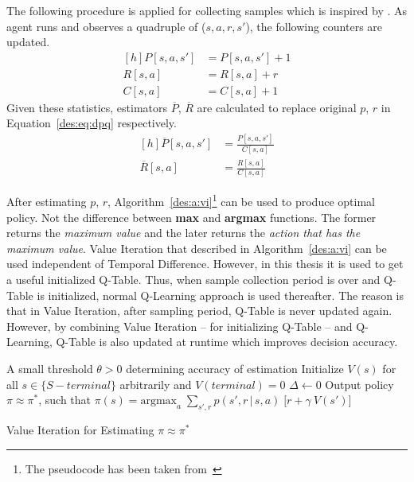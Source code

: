 The following procedure is applied for collecting samples which is inspired by \textcite{dutreilh:hal-01122123}. As agent runs and observes a quadruple of ($s,a,r,s'$), the following counters are updated.
\begin{equation}
\begin{aligned}[h]
P[s,a,s'] &= P[s,a,s'] + 1\\
R[s,a] &= R[s,a] + r \\
C[s,a] &= C[s,a] + 1
\end{aligned}
\end{equation}
Given these statistics, estimators $\overline{P}$, $\overline{R}$ are calculated to replace original $p$, $r$ in Equation~\ref{des:eq:dpq} respectively.
\begin{equation}
\begin{aligned}[h]
\overline{P}[s,a,s'] &= \frac{P[s,a,s']}{C[s,a]} \\
\overline{R}[s,a] &= \frac{R[s,a]}{C[s,a]}
\end{aligned}
\end{equation}

After estimating $p$, $r$, Algorithm~\ref{des:a:vi}\footnote{The pseudocode has been taken from~\textcite{rlIntro}} can be used to produce optimal policy. Not the difference between \textbf{max} and \textbf{argmax} functions. The former returns the \emph{maximum value} and the later returns the \emph{action that has the maximum value}. Value Iteration that described in Algorithm~\ref{des:a:vi} can be used independent of Temporal Difference. However, in this thesis it is used to get a useful initialized Q-Table. Thus, when sample collection period is over and Q-Table is initialized, normal Q-Learning approach is used thereafter. The reason is that in Value Iteration, after sampling period, Q-Table is never updated again. However, by combining Value Iteration -- for initializing Q-Table -- and Q-Learning, Q-Table is also updated at runtime which improves decision accuracy.
\begin{algorithm}[h]
	\DontPrintSemicolon
	
	A small threshold $\theta > 0$ determining accuracy of estimation\;
	Initialize $V(s)$ for all $s \in \{S - terminal\}$ arbitrarily and $V(terminal) = 0$\;
	\BlankLine
	\Repeat{$\Delta < \theta$} {
		$\Delta \gets 0$\;
		\BlankLine
		Output policy $\pi \approx \pi^*$, such that\;
		$\pi(s) = \text{argmax}_a\;\sum_{s',r} p(s',r\,|\,s,a)\;\Big[r + \gamma\:V(s')\Big]$
	}
	\caption{Value Iteration for Estimating $\pi \approx \pi^*$}
	\label{des:a:vi}
\end{algorithm}

